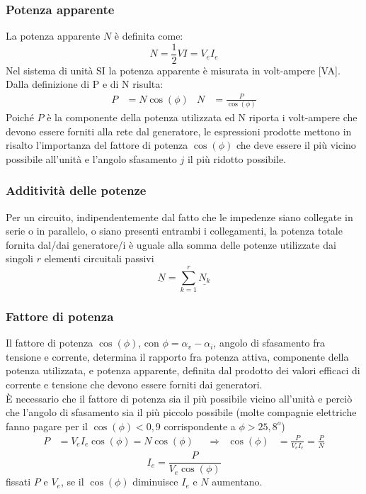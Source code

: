 \documentclass{article}
\begin{document}
\subsubsection{Potenza apparente}
La potenza apparente $N$ è definita come:
\[N = \frac{1}{2}VI=V_eI_e\]
Nel sistema di unità SI la potenza apparente è misurata in volt-ampere [VA].\\
Dalla definizione di P e di N risulta:
\begin{align*}
    P &= N \cos(\phi) & N &= \frac{P}{\cos(\phi)}
\end{align*}
Poiché $P$ è la componente della potenza utilizzata ed N riporta i volt-ampere
che devono essere forniti alla rete dal generatore, le espressioni prodotte
mettono in risalto l'importanza del fattore di potenza $\cos(\phi)$ che deve essere il
più vicino possibile all'unità e l'angolo sfasamento $j$ il più ridotto possibile.


\subsubsection{Additività delle potenze}
Per un circuito, indipendentemente dal fatto che le impedenze siano collegate in serie o in parallelo, o siano presenti entrambi i collegamenti, la potenza totale fornita dal/dai generatore/i è uguale alla somma delle potenze utilizzate dai singoli $r$ elementi circuitali passivi
\[\underline{N} = \sum_{k=1}^r \underline{N_k}\]

\subsubsection{Fattore di potenza}
Il fattore di potenza $\cos(\phi)$, con $\phi = \alpha_v-\alpha_i$, angolo di sfasamento fra
tensione e corrente, determina il rapporto fra potenza attiva, componente della potenza utilizzata, e potenza apparente, definita dal prodotto dei valori efficaci di corrente e tensione che devono essere forniti dai generatori.\\
È necessario che il fattore di potenza sia il più possibile vicino all'unità e perciò che l'angolo di sfasamento sia il più piccolo possibile (molte compagnie elettriche fanno pagare per il $\cos(\phi) < 0,9$ corrispondente a $\phi > 25,8^o$)
\begin{align*}
    P &= V_eI_e \cos(\phi)=N \cos(\phi) & &\Longrightarrow & \cos(\phi) &= \frac{P}{V_eI_e} = \frac{P}{N}
\end{align*}
\[I_e = \frac{P}{V_e \cos(\phi)}\]
fissati $P$ e $V_e$, se il $\cos(\phi)$ diminuisce $I_e$ e $N$ aumentano.
\end{document}
